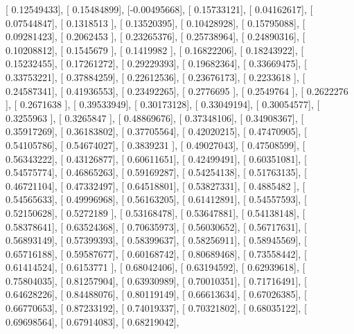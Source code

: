 \documentclass{article}
\begin{document}
       [ 0.12549433],
       [ 0.15484899],
       [-0.00495668],
       [ 0.15733121],
       [ 0.04162617],
       [ 0.07544847],
       [ 0.1318513 ],
       [ 0.13520395],
       [ 0.10428928],
       [ 0.15795088],
       [ 0.09281423],
       [ 0.2062453 ],
       [ 0.23265376],
       [ 0.25738964],
       [ 0.24890316],
       [ 0.10208812],
       [ 0.1545679 ],
       [ 0.1419982 ],
       [ 0.16822206],
       [ 0.18243922],
       [ 0.15232455],
       [ 0.17261272],
       [ 0.29229393],
       [ 0.19682364],
       [ 0.33669475],
       [ 0.33753221],
       [ 0.37884259],
       [ 0.22612536],
       [ 0.23676173],
       [ 0.2233618 ],
       [ 0.24587341],
       [ 0.41936553],
       [ 0.23492265],
       [ 0.2776695 ],
       [ 0.2549764 ],
       [ 0.2622276 ],
       [ 0.2671638 ],
       [ 0.39533949],
       [ 0.30173128],
       [ 0.33049194],
       [ 0.30054577],
       [ 0.3255963 ],
       [ 0.3265847 ],
       [ 0.48869676],
       [ 0.37348106],
       [ 0.34908367],
       [ 0.35917269],
       [ 0.36183802],
       [ 0.37705564],
       [ 0.42020215],
       [ 0.47470905],
       [ 0.54105786],
       [ 0.54674027],
       [ 0.3839231 ],
       [ 0.49027043],
       [ 0.47508599],
       [ 0.56343222],
       [ 0.43126877],
       [ 0.60611651],
       [ 0.42499491],
       [ 0.60351081],
       [ 0.54575774],
       [ 0.46865263],
       [ 0.59169287],
       [ 0.54254138],
       [ 0.51763135],
       [ 0.46721104],
       [ 0.47332497],
       [ 0.64518801],
       [ 0.53827331],
       [ 0.4885482 ],
       [ 0.54565633],
       [ 0.49996968],
       [ 0.56163205],
       [ 0.61412891],
       [ 0.54557593],
       [ 0.52150628],
       [ 0.5272189 ],
       [ 0.53168478],
       [ 0.53647881],
       [ 0.54138148],
       [ 0.58378641],
       [ 0.63524368],
       [ 0.70635973],
       [ 0.56030652],
       [ 0.56717631],
       [ 0.56893149],
       [ 0.57399393],
       [ 0.58399637],
       [ 0.58256911],
       [ 0.58945569],
       [ 0.65716188],
       [ 0.59587677],
       [ 0.60168742],
       [ 0.80689468],
       [ 0.73558442],
       [ 0.61414524],
       [ 0.6153771 ],
       [ 0.68042406],
       [ 0.63194592],
       [ 0.62939618],
       [ 0.75804035],
       [ 0.81257904],
       [ 0.63930989],
       [ 0.70010351],
       [ 0.71716491],
       [ 0.64628226],
       [ 0.84488076],
       [ 0.80119149],
       [ 0.66613634],
       [ 0.67026385],
       [ 0.66770653],
       [ 0.87233192],
       [ 0.74019337],
       [ 0.70321802],
       [ 0.68035122],
       [ 0.69698564],
       [ 0.67914083],
       [ 0.68219042],
\end{document}
